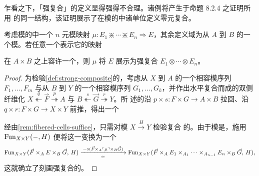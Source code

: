 乍看之下，「强复合」的定义显得强得不合理。诸例将产生于命题 8.2.4 之证明所用
的同一结构，该证明展示了在模的\trVirtualEquipment{}中诸单位定义零元复合。

\begin{lemma}\label{lem:fibered-adjoint-strong-composite}
考虑模的\trVirtualEquipment{}中一个 $n$ 元模映射
$\mu\colon E_{1}\divideontimes\cdots\divideontimes E_{n}\Rightarrow E$，其余定义域为从 $A$
到 $B$ 的一个模。若任意一个表示它的\trSpan{}映射
\begin{center}
\end{center}
在 $A\times B$ 之上容许一个\trFiberedAdjunction，则 $\mu$ 将 $E$ 展示为强复合
$E_{1}\otimes\cdots\otimes E_{n}$。
\end{lemma}

\begin{proof}
为检验\cref{def:strong-composite}的\trUniversalProperty，考虑从 $X$ 到 $A$
的一个相容模序列 $F_{1},\ldots,F_{m}$ 与从 $B$ 到 $Y$ 的一个相容模序列
$G_{1},\ldots,G_{k}$，并作出水平复合而成的双侧纤维化
$X\overset{q}{\twoheadleftarrow}\vec{F}\overset{p}{\twoheadrightarrow}A$ 与
$B\overset{s}{\twoheadleftarrow}\vec{G}\overset{r}{\twoheadrightarrow}Y$。所
述的\trFiberedAdjunction{}沿 $p\times s\colon F\times G\to A\times B$ 拉回、沿
$q\times r\colon F\times G\to X\times Y$ 前推，得出一个\trFiberedAdjunction
\begin{center}
\end{center}
经由\cref{rem:fibered-cells-suffice}，只需对模 $X\xrightarrow{H}Y$ 检验复合
的\trUniversalProperty。由于模是\trDiscrete，施用 $\operatorname{Fun}_{X\times Y}(-,H)$
便将这一\trFiberedAdjunction{}变换为一个\trAdjointEquivalence
\begin{equation*}
\Fun_{X\times Y}(\vec{F}\times_{A}E\times_{B}\vec{G},\,H)
\xrightarrow[\ \simeq\ ]{\,-\circ(\vec{F}\times_{A}\ulcorner\mu\urcorner\times_{B}\vec{G})\,}
\Fun_{X\times Y}(\vec{F}\times_{A}E_{1}\times_{A_{1}}\cdots\times_{A_{n-1}}E_{n}\times_{B}\vec{G},\,H),
\end{equation*}
这就确立了刻画强复合的\trUniversalProperty。
\end{proof}

